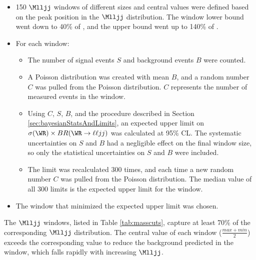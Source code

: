 \begin{itemize}
	\item 150 $\Mlljj$ windows of different sizes and central values were defined based on the peak position in the \WR $\Mlljj$ 
		distribution.  The window lower bound went down to 40\% of \mWR, and the upper bound went up to 140\% of \mWR.
	\item For each window:
	\begin{itemize}
		\item The number of signal events $S$ and background events $B$ were counted.
		\item A Poisson distribution was created with mean $B$, and a random number $C$ was pulled 
			from the Poisson distribution.  $C$ represents the number of measured events in the window.
		\item Using $C$, $S$, $B$, and the procedure described in Section \ref{sec:bayesianStatsAndLimits}, an 
			expected upper limit on $\sigma(\WR) \times BR(\WR \rightarrow \ell\ell jj)$ was calculated at 
			95\% CL.  The systematic uncertainties on $S$ and $B$ had a negligible effect on the final 
			window size, so only the statistical uncertainties on $S$ and $B$ were included.
		\item The limit was recalculated 300 times, and each time a new random number $C$ was pulled 
			from the Poisson distribution.  The median value of all 300 limits is the expected upper limit 
			for the window.
	\end{itemize}
	\item The window that minimized the expected upper limit was chosen.
\end{itemize}

The $\Mlljj$ windows, listed in Table \ref{tab:masscuts}, capture at least 70\% of the corresponding \WR $\Mlljj$ distribution.  
The central value of each window ($\frac{max \plus min}{2}$) exceeds the corresponding \mWR value to reduce the background predicted 
in the window, which falls rapidly with increasing $\Mlljj$.

